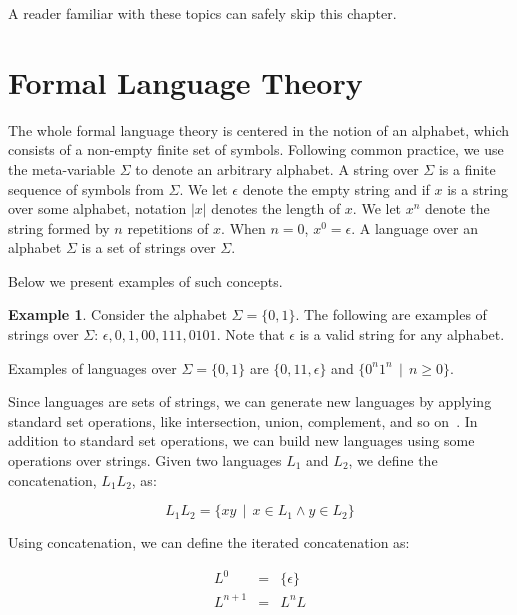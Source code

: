 \documentclass[oneside,12pt]{scrbook}
\renewcommand{\geq}{\geqslant}
\theoremstyle{definition}
\newtheorem{Example}{Example}
\newcommand{\size}{\ensuremath{\texttt{size}}}
\theoremstyle{plain}
\theoremstyle{definition}
\begin{document}
A reader familiar with these topics can safely skip this chapter.

\section{Formal Language Theory}\label{section:formallanguage}

The whole formal language theory is centered in the notion of an alphabet, which consists of a
non-empty finite set of symbols. Following common practice, we use the meta-variable $\Sigma$ to
denote an arbitrary alphabet. A string over $\Sigma$ is a finite sequence of symbols from $\Sigma$.
We let $\epsilon$ denote the empty string and if $x$ is a string over some alphabet, notation $|x|$
denotes the length of $x$. We let $x^n$ denote the string formed by $n$ repetitions of $x$.
When $n = 0$, $x^0 = \epsilon$. A language over an alphabet $\Sigma$ is a set of strings over $\Sigma$.

Below we present examples of such concepts.

\begin{Example}
  Consider the alphabet $\Sigma = \{0,1\}$. The following are examples of strings over $\Sigma$:
  $\epsilon, 0, 1, 00, 111, 0101$. Note that $\epsilon$ is a valid string for any
  alphabet. %

  Examples of languages over $\Sigma = \{0,1\}$ are $\{0,11,\epsilon\}$ and $\{0^n1^n\,\mid\,n \geq 0\}$.
\end{Example}

Since languages are sets of strings, we can generate new languages by applying standard set operations,
like intersection, union, complement, and so on~\cite{Hopcroft2000}. In addition to standard set operations,
we can build new languages using some operations over strings. Given two languages $L_1$ and $L_2$, we define the
concatenation, $L_1L_2$, as:

\begin{equation*}
L_1L_2 =\{xy\,\mid\,x \in L_1 \land y \in L_2\}
\end{equation*}

Using concatenation, we can define the iterated concatenation as:

\begin{equation*}
\begin{array}{lcl}
  L^0       & = & \{\epsilon\}\\
  L^{n + 1} & = & L^n L
\end{array}
\end{equation*}
\end{document}
